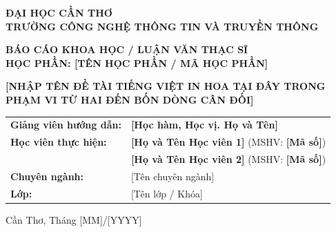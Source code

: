 
\begin{titlepage}
  \thispagestyle{empty}

  \begin{center}
    {\fontsize{14bp}{17bp}\selectfont \textbf{ĐẠI HỌC CẦN THƠ}\\
    \textbf{TRƯỜNG CÔNG NGHỆ THÔNG TIN VÀ TRUYỀN THÔNG}\par}
    \vspace{2.2cm}

    {\fontsize{14bp}{17bp}\selectfont \textbf{BÁO CÁO KHOA HỌC / LUẬN VĂN THẠC SĨ}\\
    \textbf{HỌC PHẦN: [TÊN HỌC PHẦN / MÃ HỌC PHẦN]}\par}

    \vfill

    {\fontsize{20bp}{25bp}\selectfont \bfseries [NHẬP TÊN ĐỀ TÀI TIẾNG VIỆT IN HOA TẠI ĐÂY TRONG PHẠM VI TỪ HAI ĐẾN BỐN DÒNG CÂN ĐỐI]\par}
    \vspace{0.4cm}

    {\fontsize{18bp}{22.5bp}\par}
    \vspace{0.4cm}

    \vfill

    {\fontsize{14bp}{17bp}\selectfont
    \begin{tabular}{ll}
      \textbf{Giảng viên hướng dẫn:} & \textbf{[Học hàm, Học vị. Họ và Tên]} \\[0.35cm]
      \textbf{Học viên thực hiện:}   & \textbf{[Họ và Tên Học viên 1]} (MSHV: \textbf{[Mã số]}) \\
                                     & \textbf{[Họ và Tên Học viên 2]} (MSHV: \textbf{[Mã số]}) \\[0.2cm]
      \textbf{Chuyên ngành:}         & [Tên chuyên ngành] \\
      \textbf{Lớp:}                  & [Tên lớp / Khóa]
    \end{tabular}}

    \vfill

    {\fontsize{14bp}{17bp}\selectfont Cần Thơ, Tháng [MM]/[YYYY]}
  \end{center}
\end{titlepage}
